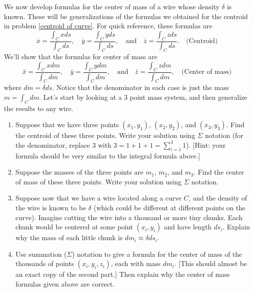 \begin{problem}\label{center of mass of curve}%
%
%
We now develop formulas for the center of mass of a wire whose density $\delta$ is known. These will be generalizations of the formulas we obtained for the centroid in problem \ref{centroid of curve}. For quick reference, these formulas are 
$$
\bar x = \frac{\int_C x ds}{\int_C  ds},\quad
\bar y = \frac{\int_C y ds}{\int_C  ds},\quad 
\text{and}\quad
\bar z = \frac{\int_C z ds}{\int_C  ds}.  \quad\text{(Centroid)}
$$
We'll show that the formulas for center of mass are  %
$$
\bar x = \frac{\int_C x dm}{\int_C  dm},\quad
\bar y = \frac{\int_C y dm}{\int_C  dm},\quad 
\text{and}\quad
\bar z = \frac{\int_C z dm}{\int_C  dm},  \quad\text{(Center of mass)}
$$
where $dm=\delta ds$. Notice that the denominator in each case is just the mass $m=\int_C dm$.
Let's start by looking at a 3 point mass system, and then generalize the results to any wire. 
\begin{enumerate}
 \item Suppose that we have three points $(x_1,y_1)$, $(x_2,y_2)$, and $(x_3,y_3)$. Find the centroid of these three points. Write your solution using $\Sigma$ notation (for the denominator, replace 3 with $3=1+1+1=\sum_{i=1}^3 1$). [Hint: your formula should be very similar to the integral formula above.]
 \item Suppose the masses of the three points are $m_1$, $m_2$, and  $m_3$. Find the center of mass of these three points. Write your solution using $\Sigma$ notation.
 \item Suppose now that we have a wire located along a curve $C$, and the density of the wire is known to be $\delta$ (which could be different at different points on the curve).  Imagine cutting the wire into a thousand or more tiny chunks.  Each chunk would be centered at some point $(x_i,y_i)$ and have length $ds_i$. Explain why the mass of each little chunk is $dm_i\approx\delta ds_i$. 
 \item Use summation ($\Sigma$) notation to give a formula for the center of mass of the thousands of points $(x_i,y_i,z_i)$, each with mass $dm_i$. [This should almost be an exact copy of the second part.] 
 Then explain why the center of mass formulas given above are correct.
\end{enumerate}
 
\end{problem}

